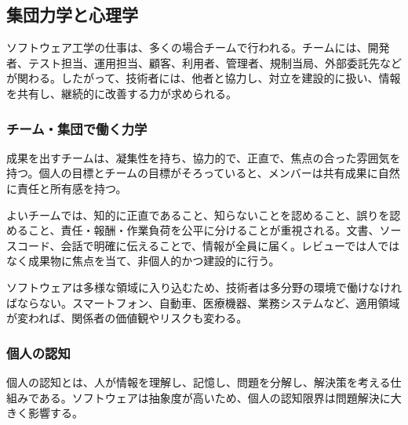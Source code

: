\subsection*{集団力学と心理学}


ソフトウェア工学の仕事は、多くの場合チームで行われる。チームには、開発者、テスト担当、運用担当、顧客、利用者、管理者、規制当局、外部委託先などが関わる。したがって、技術者には、他者と協力し、対立を建設的に扱い、情報を共有し、継続的に改善する力が求められる。

\subsubsection*{チーム・集団で働く力学}


成果を出すチームは、凝集性を持ち、協力的で、正直で、焦点の合った雰囲気を持つ。個人の目標とチームの目標がそろっていると、メンバーは共有成果に自然に責任と所有感を持つ。

よいチームでは、知的に正直であること、知らないことを認めること、誤りを認めること、責任・報酬・作業負荷を公平に分けることが重視される。文書、ソースコード、会話で明確に伝えることで、情報が全員に届く。レビューでは人ではなく成果物に焦点を当て、非個人的かつ建設的に行う。

ソフトウェアは多様な領域に入り込むため、技術者は多分野の環境で働けなければならない。スマートフォン、自動車、医療機器、業務システムなど、適用領域が変われば、関係者の価値観やリスクも変わる。

\subsubsection*{個人の認知}


個人の認知とは、人が情報を理解し、記憶し、問題を分解し、解決策を考える仕組みである。ソフトウェアは抽象度が高いため、個人の認知限界は問題解決に大きく影響する。

